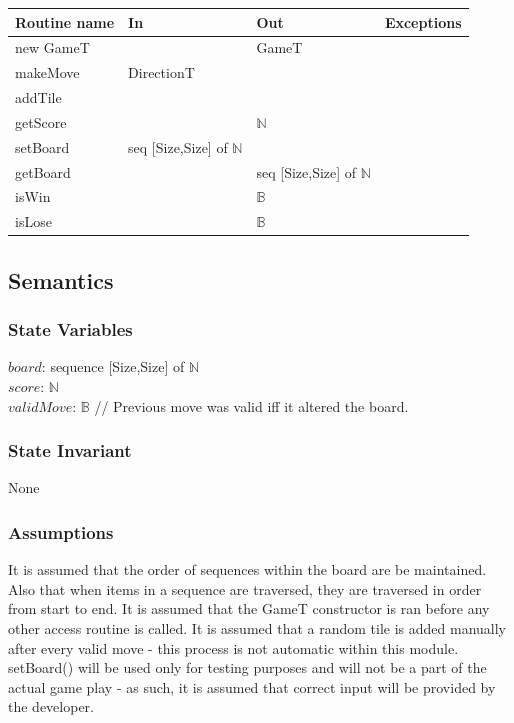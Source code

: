 \documentclass[12pt]{article}
\begin{document}
\begin{tabular}{| l | l | l | p{5cm} |}
  \hline
  \textbf{Routine name} & \textbf{In} & \textbf{Out} & \textbf{Exceptions}\\
  \hline
  new GameT & & GameT & \\
  \hline
  makeMove & DirectionT &  & ~\\
  \hline
  addTile &  &  & ~\\
  \hline
  getScore &  & $\mathbb{N}$ & ~\\
  \hline
  setBoard & seq [Size,Size] of $\mathbb{N}$ &  & ~\\
  \hline
  getBoard &  & seq [Size,Size] of $\mathbb{N}$ & ~\\
  \hline
  isWin &  & $\mathbb{B}$ & ~\\
  \hline
  isLose &  & $\mathbb{B}$ & ~\\
  \hline
\end{tabular}

\subsection* {Semantics}

\subsubsection* {State Variables}

$\mathit{board}$: sequence [Size,Size] of $\mathbb{N}$\\
$score$: $\mathbb{N}$\\
$\mathit{validMove}$: $\mathbb{B}$ // Previous move was valid iff it altered the board.

\subsubsection* {State Invariant}

None

\subsubsection* {Assumptions}

It is assumed that the order of sequences within the board are be maintained. Also that when items in a sequence are traversed, they are traversed in order from start to end. It is assumed that the GameT constructor is ran before any other access routine is called. It is assumed that a random tile is added manually after every valid move - this process is not automatic within this module. setBoard() will be used only for testing purposes and will not be a part of the actual game play - as such, it is assumed that correct input will be provided by the developer.
\end{document}
